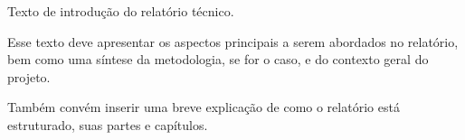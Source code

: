 
Texto de introdução do relatório técnico.

Esse texto deve apresentar os aspectos principais a serem abordados no relatório, bem como uma síntese da metodologia, se for o caso, e do contexto geral do projeto.

Também convém inserir uma breve explicação de como o relatório está estruturado, suas partes e capítulos.
